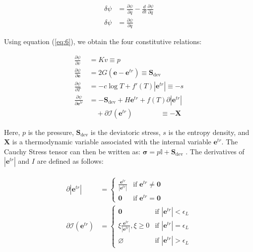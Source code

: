 \begin{multicols}{2}
\begin{align} \label{eq:7}
    \delta\psi &= \frac{\partial\psi}{\partial q} - \frac{d}{dt}\frac{\partial\psi}{\partial\dot{q}}\\
    \delta\psi &= \frac{\partial\psi}{\partial q}
\end{align}

Using equation (\ref{eq:6}), we obtain the four constitutive relations:

\begin{align}\label{eq:8}
    \frac{\partial\psi}{\partial v} &= Kv \equiv p\\
    \frac{\partial\psi}{\partial\mathbf{e}} &= 2G(\mathbf{e} - \mathbf{e}^{tr}) \equiv \bm{S}_{\mathrm{dev}}\\
    \frac{\partial\psi}{\partial T} &= -c\log{ T} + f'( T)|\mathbf{e}^{tr}| \equiv -s \label{eq:ent}\\
    \frac{\partial\psi}{\partial\mathbf{e}^{tr}} &= -\bm{S}_{\mathrm{dev}} + H\mathbf{e}^{tr} + f(T)\partial|\mathbf{e}^{tr}|\\
    & \quad + \partial \mathscr{I}(\mathbf{e}^{tr}) \quad \quad \qquad \equiv -\bm{X}\nonumber
\end{align}

Here, $p$ is the pressure, $\bm{S}_{\mathrm{dev}}$ is the deviatoric stress, $s$ is the entropy density, and $\bm{X}$ is a thermodynamic variable associated with the internal variable $\mathbf{e}^{tr}$. The Cauchy Stress tensor can then be written as: $\bm{\sigma} = p\mathbb{I} + \bm{S}_{\mathrm{dev}}$ \cite{auricchio2016gradient}. The derivatives of $|\mathbf{e}^{tr}|$ and $I$ are defined as follows:

\begin{align}\begin{split}
    \partial|\mathbf{e}^{tr}| &=
    \begin{cases}
        \frac{\mathbf{e}^{tr}}{|\mathbf{e}^{tr}|} & \text{if $\mathbf{e}^{tr} \neq \bm{0}$}\\
        \bm{0} & \text{if $\mathbf{e}^{tr} = \bm{0}$}
    \end{cases}\\
    \partial \mathscr{I}(\mathbf{e}^{tr}) &=
    \begin{cases}
        \bm{0} & \text{if $|\mathbf{e}^{tr}| < \epsilon_L$}\\
        \xi\frac{\mathbf{e}^{tr}}{|\mathbf{e}^{tr}|}, \xi \geq 0 & \text{if $|\mathbf{e}^{tr}| = \epsilon_L$}\\
        \varnothing & \text{if $|\mathbf{e}^{tr}| > \epsilon_L$}
    \end{cases}
    \end{split}\label{eq:derivative2}
\end{align}


\end{multicols}
